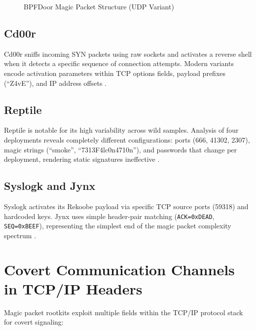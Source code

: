 \begin{figure}[h]
\centering
{}
\caption{BPFDoor Magic Packet Structure (UDP Variant)}
\label{fig:bpfdoor_packet}
\end{figure}

\subsection{Cd00r}
Cd00r sniffs incoming SYN packets using raw sockets and activates a reverse shell when it detects a specific sequence of connection attempts. Modern variants encode activation parameters within TCP options fields, payload prefixes (``Z4vE''), and IP address offsets \cite{fx2000cd00r}.

\subsection{Reptile}
Reptile is notable for its high variability across wild samples. Analysis of four deployments reveals completely different configurations: ports (666, 41302, 2307), magic strings (``smoke'', ``7313F4lc0n4710n''), and passwords that change per deployment, rendering static signatures ineffective \cite{trend2023reptile}.

\subsection{Syslogk and Jynx}
Syslogk activates its Rekoobe payload via specific TCP source ports (59318) and hardcoded keys. Jynx uses simple header-pair matching (\texttt{ACK=0xDEAD}, \texttt{SEQ=0xBEEF}), representing the simplest end of the magic packet complexity spectrum \cite{avast2022syslogk, jynx2012}.

\section{Covert Communication Channels in TCP/IP Headers}

Magic packet rootkits exploit multiple fields within the TCP/IP protocol stack for covert signaling:

